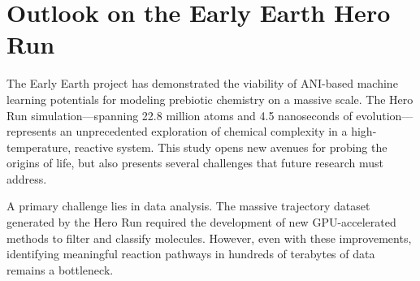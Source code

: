 \section{Outlook on the Early Earth Hero Run}

The Early Earth project has demonstrated the viability of ANI-based machine learning potentials for modeling prebiotic chemistry on a massive scale. The Hero Run simulation---spanning 22.8 million atoms and 4.5 nanoseconds of evolution---represents an unprecedented exploration of chemical complexity in a high-temperature, reactive system. This study opens new avenues for probing the origins of life, but also presents several challenges that future research must address.

A primary challenge lies in data analysis. The massive trajectory dataset generated by the Hero Run required the development of new GPU-accelerated methods to filter and classify molecules. However, even with these improvements, identifying meaningful reaction pathways in hundreds of terabytes of data remains a bottleneck. 




